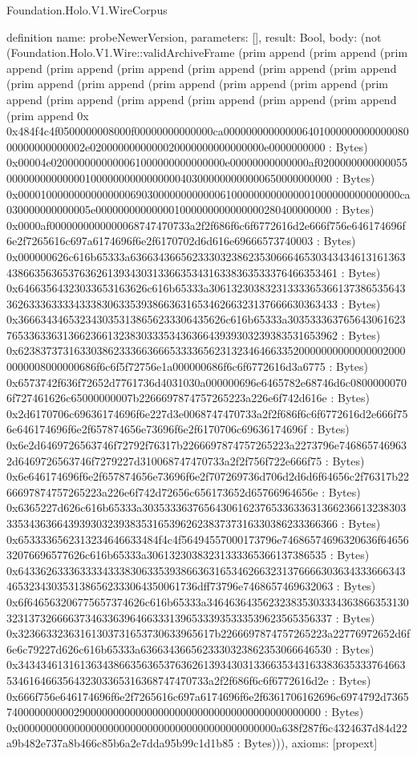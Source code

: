 \begin{lexlean}{Foundation.Holo.V1.WireCorpus}
\begin{semanticmodule}
definition{
  name: probeNewerVersion,
  parameters: [],
  result: Bool,
  body: (not (Foundation.Holo.V1.Wire::validArchiveFrame (prim append (prim append (prim append (prim append (prim append (prim append (prim append (prim append (prim append (prim append (prim append (prim append (prim append (prim append (prim append (prim append (prim append (prim append (prim append (prim append 0x 0x484f4c4f0500000008000f00000000000000ca00000000000000640100000000000008000000000000002e0200000000000020000000000000000e0000000000 : Bytes) 0x00004e0200000000000061000000000000000e00000000000000af02000000000000550000000000000010000000000000000403000000000000650000000000 : Bytes) 0x00001000000000000000690300000000000061000000000000001000000000000000ca030000000000005e000000000000001000000000000000280400000000 : Bytes) 0x0000af0000000000000068747470733a2f2f686f6c6f6772616d2e666f756e646174696f6e2f7265616c697a6174696f6e2f6170702d6d616e69666573740003 : Bytes) 0x000000626c616b65333a636634366562333032386235306664653034343461316136343866356365376362613934303133663534316338363533376466353461 : Bytes) 0x64663564323033653163626c616b65333a3061323038323133336536613738653564336263336333343338306335393866363165346266323137666630363433 : Bytes) 0x3666343465323430353138656233306435626c616b65333a30353336376564306162376533633631366236613238303335343636643939303239383531653962 : Bytes) 0x6238373731633038623336636665333365623132346466335200000000000000020000000008000000686f6c6f5f72756e1a000000686f6c6f6772616d3a6775 : Bytes) 0x6573742f636f72652d7761736d4031030a000000696e6465782e68746d6c08000000706f727461626c65000000007b2266697874757265223a226e6f742d616e : Bytes) 0x2d6170706c69636174696f6e227d3e0068747470733a2f2f686f6c6f6772616d2e666f756e646174696f6e2f657874656e73696f6e2f6170706c69636174696f : Bytes) 0x6e2d6469726563746f72792f76317b2266697874757265223a2273796e7468657469632d6469726563746f7279227d310068747470733a2f2f756f722e666f75 : Bytes) 0x6e646174696f6e2f657874656e73696f6e2f707269736d706d2d6d6f64656c2f76317b2266697874757265223a226e6f742d72656c656173652d65766964656e : Bytes) 0x6365227d626c616b65333a3035333637656430616237653363363136623661323830333534363664393930323938353165396262383737316330386233366366 : Bytes) 0x6533336562313234646633484f4c4f56494557000173796e74686574696320636f6465632076696577626c616b65333a30613230383231333365366137386535 : Bytes) 0x6433626333633334333830633539386636316534626632313766663036343336663434653234303531386562333064350061736dff73796e7468657469632063 : Bytes) 0x6f646563206775657374626c616b65333a3464636435623238353033343638663531303231373266663734633639646633313965333935333539623565356337 : Bytes) 0x32366332363161303731653730633965617b2266697874757265223a22776972652d6f6e6c79227d626c616b65333a6366343665623330323862353066646530 : Bytes) 0x343434613161363438663563653763626139343031336635343163383635333764663534616466356432303365316368747470733a2f2f686f6c6f6772616d2e : Bytes) 0x666f756e646174696f6e2f7265616c697a6174696f6e2f6361706162696c6974792d736574000000000029000000000000000000000000000000000000000000 : Bytes) 0x0000000000000000000000000000000000000000000000a638f287f6c4324637d84d22a9b482e737a8b466c85b6a2e7dda95b99c1d1b85 : Bytes))),
  axioms: [propext]
}


\end{semanticmodule}
\end{lexlean}
